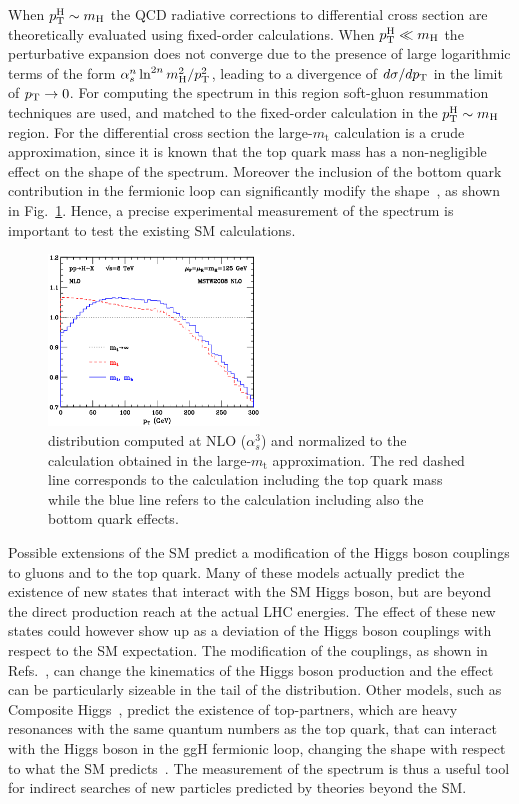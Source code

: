 When $p_\mathrm{T}^\mathrm{H} \sim m_\mathrm{H}$ the QCD radiative corrections to \pth differential cross section are theoretically evaluated using fixed-order calculations. When $p_\mathrm{T}^\mathrm{H} \ll m_\mathrm{H}$ the perturbative expansion does not converge due to the presence of large logarithmic terms of the form $\alpha_s^n \ln^{2n}m_\mathrm{H}^2/p_\mathrm{T}^2$, leading to a divergence of $d\sigma/dp_\mathrm{T}$ in the limit of $p_\mathrm{T}\to0$. For computing the \pth spectrum in this region soft-gluon resummation techniques are used, and matched to the fixed-order calculation in the $p_\mathrm{T}^\mathrm{H} \sim m_\mathrm{H}$ region.
For the \pth differential cross section the large-$m_\mathrm{t}$ calculation is a crude approximation, since it is known that the top quark mass has a non-negligible effect on the shape of the spectrum. Moreover the inclusion of the bottom quark contribution in the fermionic loop can significantly modify the \pth shape~\cite{Grazzini:2013mca}, as shown in Fig.~\ref{fig:pth_quarkmass}. Hence, a precise experimental measurement of the \pth spectrum is important to test the existing SM calculations. 

\begin{figure}[!h]
\centering
\includegraphics[width=0.5\textwidth]{images/pth_quarkmass.png}
\caption{\pth distribution computed at NLO ($\alpha_s^3$) and normalized to the calculation obtained in the large-$m_\mathrm{t}$ approximation. The red dashed line corresponds to the calculation including the top quark mass while the blue line refers to the calculation including also the bottom quark effects.}\label{fig:pth_quarkmass}
\end{figure}

Possible extensions of the SM predict a modification of the Higgs boson couplings to gluons and to the top quark. Many of these models actually predict the existence of new states that interact with the SM Higgs boson, but are beyond the direct production reach at the actual LHC energies. The effect of these new states could however show up as a deviation of the Higgs boson couplings with respect to the SM expectation. The modification of the couplings, as shown in Refs.~\cite{Azatov:2013xha,Harlander:2013oja}, can change the kinematics of the Higgs boson production and the effect can be particularly sizeable in the tail of the \pth distribution. 
Other models, such as Composite Higgs~\cite{Marzocca:2012zn}, predict the existence of top-partners, which are heavy resonances with the same quantum numbers as the top quark, that can interact with the Higgs boson in the ggH fermionic loop, changing the \pth shape with respect to what the SM predicts~\cite{Banfi:2013yoa}.
The measurement of the \pth spectrum is thus a useful tool for indirect searches of new particles predicted by theories beyond the SM.

